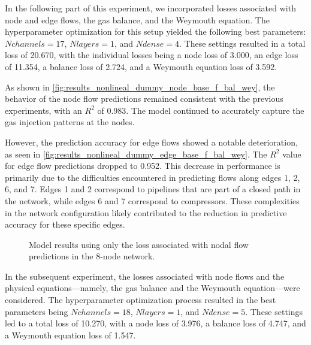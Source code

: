 In the following part of this experiment, we incorporated losses associated with node and edge flows, the gas balance, and the Weymouth equation. The hyperparameter optimization for this setup yielded the following best parameters: $N channels=17$, $N layers =1$, and $N dense =4$. These settings resulted in a total loss of 20.670, with the individual losses being a node loss of 3.000, an edge loss of 11.354, a balance loss of 2.724, and a Weymouth equation loss of 3.592.

As shown in \cref{fig:results_nonlineal_dummy_node_base_f_bal_wey}, the behavior of the node flow predictions remained consistent with the previous experiments, with an $R^2$ of 0.983. The model continued to accurately capture the gas injection patterns at the nodes.

However, the prediction accuracy for edge flows showed a notable deterioration, as seen in \cref{fig:results_nonlineal_dummy_edge_base_f_bal_wey}. The $R^2$ value for edge flow predictions dropped to 0.952. This decrease in performance is primarily due to the difficulties encountered in predicting flows along edges 1, 2, 6, and 7. Edges 1 and 2 correspond to pipelines that are part of a closed path in the network, while edges 6 and 7 correspond to compressors. These complexities in the network configuration likely contributed to the reduction in predictive accuracy for these specific edges.

\begin{figure}
    \centering
    \setlength{}        
    \setlength{} 
    
    \caption{Model results using only the loss associated with nodal flow predictions in the 8-node network.}
    \label{fig:dummy_base_results}
\end{figure}



In the subsequent experiment, the losses associated with node flows and the physical equations—namely, the gas balance and the Weymouth equation—were considered. The hyperparameter optimization process resulted in the best parameters being $N channels=18$, $N layers=1$, and $N dense=5$. These settings led to a total loss of 10.270, with a node loss of 3.976, a balance loss of 4.747, and a Weymouth equation loss of 1.547.

